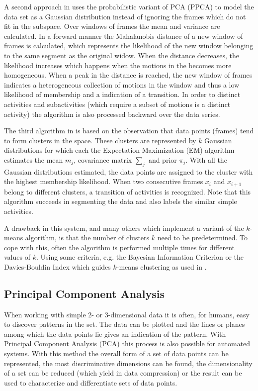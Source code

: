 A second approach in \cite{barbivc2004segmenting} uses the probabilistic 
variant of PCA (PPCA) to model the data set as a Gaussian distribution instead 
of ignoring the frames which do not fit in the subspace. Over windows of 
frames the mean and variance are calculated. In a forward manner the 
Mahalanobis distance of a new window of frames is calculated, which represents 
the likelihood of the new window belonging to the same segment as the original 
widow. When the distance decreases, the likelihood increases which happens 
when the motions in the becomes more homogeneous. When a peak in the distance 
is reached, the new window of frames indicates a heterogeneous collection of 
motions in the window and thus a low likelihood of membership and a indication 
of a transition. In order to distinct activities and subactivities (which 
require a subset of motions is a distinct activity) the algorithm is also 
processed backward over the data series.

The third algorithm in \cite{barbivc2004segmenting} is based on the 
observation that data points (frames) tend to form clusters in the space. 
These clusters are represented by $k$ Gaussian distributions for which each 
the Expectation-Maximization (EM) algorithm estimates the mean $m_j$, 
covariance matrix $\sum_{j}$ and prior $\pi_j$. With all the Gaussian 
distributions estimated, the data points are assigned to the cluster with the 
highest membership likelihood. When two consecutive frames $x_i$ and $x_{i+1}$ 
belong to different clusters, a transition of activities is recognized. Note 
that this algorithm succeeds in segmenting the data and also labels the 
similar simple activities.

A drawback in this system, and many others which implement a variant of the 
$k$-means algorithm, is that the number of clusters $k$ need to be 
predetermined. To cope with this, often the algorithm is performed multiple 
times for different values of $k$. Using some criteria, e.g. the Bayesian 
Information Criterion \cite{pelleg2000x} or the Davies-Bouldin Index which 
guides $k$-means clustering as used in \cite{krause2003unsupervised}.

\subsection{Principal Component Analysis}
When working with simple 2- or 3-dimensional data it is often, for humans, 
easy to discover patterns in the set. The data can be plotted and the lines or 
planes among which the data points lie gives an indication of the pattern. 
With Principal Component Analysis (PCA) this process is also possible for 
automated systems. With this method the overall form of a set of data points 
can be represented, the most discriminative dimensions can be found, the 
dimensionality of a set can be reduced (which yield in data compression) or 
the result can be used to characterize and differentiate sets of data points.

